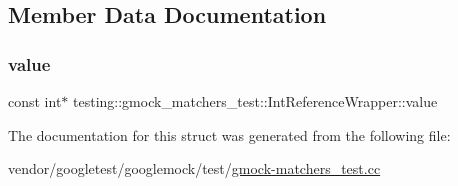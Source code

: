 \subsection{Member Data Documentation}
\mbox{\label{structtesting_1_1gmock__matchers__test_1_1_int_reference_wrapper_ac8fcb05733aa1fdb6c5236731b236cf6}} 
\subsubsection{\texorpdfstring{value}{value}}
{\footnotesize\ttfamily const int$\ast$ testing\+::gmock\+\_\+matchers\+\_\+test\+::\+Int\+Reference\+Wrapper\+::value}



The documentation for this struct was generated from the following file\+:\begin{DoxyCompactItemize}
\item 
vendor/googletest/googlemock/test/\hyperlink{gmock-matchers__test_8cc}{gmock-\/matchers\+\_\+test.\+cc}\end{DoxyCompactItemize}
